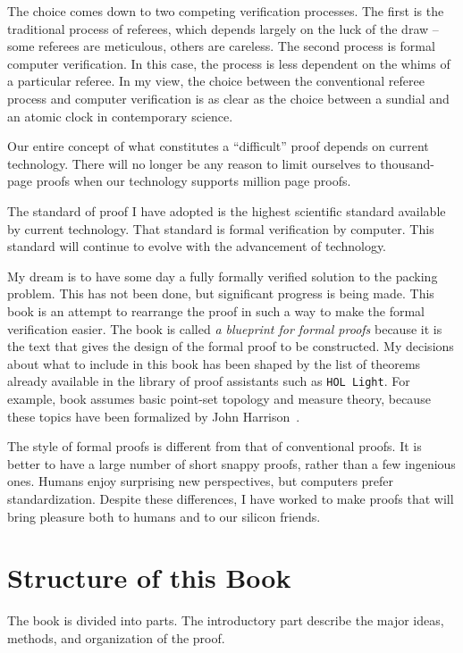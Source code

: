 The choice comes down to two competing verification processes.  The
first is the traditional process of referees, which depends largely on
the luck of the draw -- some referees are meticulous, others are
careless.  The second process is formal computer verification. In this
case, the process is less dependent on the whims of a particular
referee.  In my view, the choice between the conventional referee
process and computer verification is as clear as the choice between
a sundial and an atomic clock in contemporary science.  

Our entire
concept of what constitutes a ``difficult'' proof depends on current technology.
There will no longer be any reason to limit ourselves to thousand-page proofs
when our technology supports million page proofs.

The standard of proof I have adopted is the highest scientific standard
available by current technology.  That 
standard is formal verification by computer.  This standard will
continue to evolve with the advancement of technology.

My dream is to have some day a fully formally verified solution to the
packing problem.  This has not been done, but significant progress is
being made.  This book is an attempt to rearrange the proof in such a
way to make the formal verification easier.  The book is called {\it a
  blueprint for formal proofs} because it is the text that gives the
design of the formal proof to be constructed.  My decisions about what
to include in this book has been shaped by the list of theorems
already available in the library of proof assistants such as {\tt HOL
  Light}.  For example, book assumes basic point-set topology and
measure theory, because these topics have been formalized by John
Harrison~\cite{unknown}.

The style of formal proofs is different from that of
conventional proofs.  It is better to have a large number of short
snappy proofs, rather than a few ingenious ones.  Humans enjoy
surprising new perspectives, but computers prefer standardization.
Despite these differences, I have worked to make proofs that
will bring pleasure both to humans and to our silicon friends.



\section*{Structure of this Book}

The book is divided into parts.
The introductory part describe the major ideas, methods, and
organization of the proof.  


